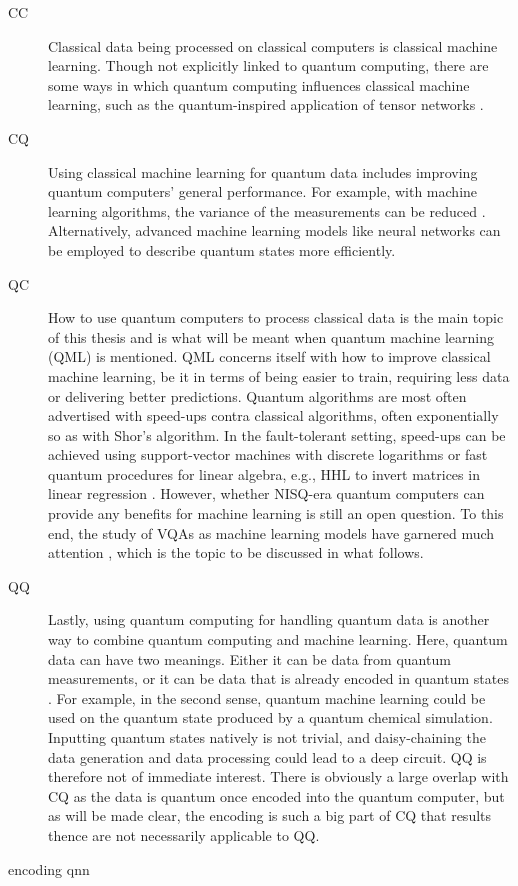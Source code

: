 \begin{description}
    \item[CC]
        Classical data being processed on classical computers is classical machine learning.
        Though not explicitly linked to quantum computing, there are some ways in which quantum computing influences classical machine learning, such as the quantum-inspired application of tensor networks \cite{felser2021}.

    \item[CQ]
        Using classical machine learning for quantum data includes improving quantum computers' general performance.
        For example, with machine learning algorithms, the variance of the measurements can be reduced \cite{torlai2020}.
        Alternatively, advanced machine learning models like neural networks can be employed to describe quantum states more efficiently.


    \item[QC]
        How to use quantum computers to process classical data is the main topic of this thesis and is what will be meant when quantum machine learning (QML) is mentioned.
        QML concerns itself with how to improve classical machine learning, be it in terms of being easier to train, requiring less data or delivering better predictions.
        Quantum algorithms are most often advertised with speed-ups contra classical algorithms, often exponentially so as with Shor's algorithm.
        In the fault-tolerant setting, speed-ups can be achieved using support-vector machines with discrete logarithms \cite{liu2021} or fast quantum procedures for linear algebra, e.g., HHL to invert matrices in linear regression \cite{wiebe2012}.
        However, whether NISQ-era quantum computers can provide any benefits for machine learning is still an open question.
        To this end, the study of VQAs as machine learning models have garnered much attention \cite{benedetti2019}, which is the topic to be discussed in what follows.

    \item[QQ]
        Lastly, using quantum computing for handling quantum data is another way to combine quantum computing and machine learning.
        Here, quantum data can have two meanings.
        Either it can be data from quantum measurements, or it can be data that is already encoded in quantum states \cite{schuld2021a}.
        For example, in the second sense, quantum machine learning could be used on the quantum state produced by a quantum chemical simulation.
        Inputting quantum states natively is not trivial, and daisy-chaining the data generation and data processing could lead to a deep circuit.
        QQ is therefore not of immediate interest.
        There is obviously a large overlap with CQ as the data is quantum once encoded into the quantum computer, but as will be made clear, the encoding is such a big part of CQ that results thence are not necessarily applicable to QQ.

\end{description}



{encoding}
{qnn}
